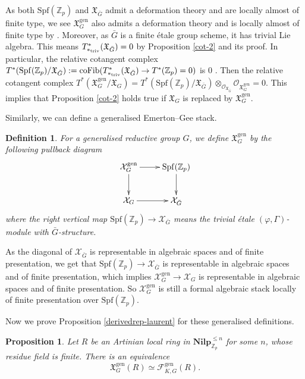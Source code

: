 \documentclass[10pt]{article}
\newtheorem{prop}[thm]{Proposition}
\newtheorem{dfn}[thm]{Definition}
\numberwithin{equation}{section}
\newcommand{\frakX}{{\mathfrak X}}
\newcommand{\bZ}{{\mathbb Z}}
\newcommand{\calF}{{\mathcal F}}
\newcommand{\calO}{{\mathcal O}}
\newcommand{\calX}{{\mathcal X}}
\newcommand{\Spf}{{\mathrm{Spf}}}           %
\newcommand{\gen}{{\mathrm{gen}}}
\begin{document}
As both $\Spf(\bZ_p)$ and $\frakX_{\bar G}$ admit a deformation theory and are locally almost of finite type, we see $\frakX_G^{\gen}$ also admits a deformation theory and is locally almost of finite type by \cite[Proposition 3.23]{Min23}. Moreover, as $\bar G$ is a finite \'etale group scheme, it has trivial Lie algebra. This means $T^*_{*_{\rm triv}}(\frakX_{\bar G})=0$ by Proposition \ref{cot-2} and its proof. In particular, the relative cotangent complex $T^*(\Spf(\bZ_p)/\frakX_{\bar G}):={\rm coFib}(T^*_{*_{\rm triv}}(\frakX_{\bar G})\to T^*(\bZ_p)=0)$ is $0$ . Then the relative cotangent complex $T^*(\frakX_G^{\gen}/\frakX_G)=T^*(\Spf(\bZ_p)/\frakX_{\bar G})\otimes_{\calO_{\frakX_{\bar G}}}\calO_{\frakX_G^{\gen}}=0$. This implies that Proposition \ref{cot-2} holds true if $\frakX_G$ is replaced by $\frakX_{G}^{\gen}$.

Similarly, we can define a generalised Emerton--Gee stack.

\begin{dfn}\label{dfn-gen-EG}
      For a generalised reductive group $G$, we define $\frakX_G^{\gen}$ by the following pullback diagram
    \begin{equation}
        \xymatrix{
        \calX_G^{\gen}\ar[r]\ar[d]& \Spf(\bZ_p)\ar[d]\\
        \calX_G\ar[r]& \calX_{\bar G}
        }
    \end{equation}
    where the right vertical map $\Spf(\bZ_p)\to \calX_{\bar G}$ means the trivial \'etale $(\varphi,\Gamma)$-module with $\bar G$-structure.
\end{dfn}

As the diagonal of $\calX_{\bar G}$ is representable in algebraic spaces and of finite presentation, we get that $\Spf(\bZ_p)\to \calX_{\bar G}$ is representable in algebraic spaces and of finite presentation, which implies $\calX_G^{\gen}\to \calX_G$ is representable in algebraic spaces  and of finite presentation. So $\calX_G^{\gen}$ is still a formal algebraic stack locally of finite presentation over $\Spf(\bZ_p)$.

Now we prove Proposition \ref{derivedrep-laurent} for these generalised definitions.

\begin{prop}\label{generalised rep-phiGamma}
      Let $R$ be an Artinian local ring in $\textbf{Nilp}_{\bZ_p}^{\leq n}$ for some $n$, whose residue field is finite. There is an equivalence
    \[
    \frakX_G^{\gen}(R)\simeq \calF_{K,G}^{\gen}(R). 
    \]
\end{prop}
\end{document}
